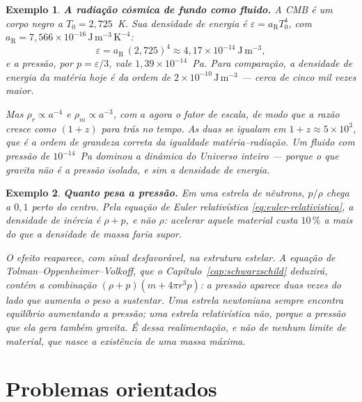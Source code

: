 \documentclass[12pt,a4paper,oneside]{book}
\theoremstyle{rgplain}
\newtheorem{example}{Exemplo}[chapter]
\theoremstyle{rgremark}
\begin{document}
\begin{example}
\textbf{A radiação cósmica de fundo como fluido.} A CMB é um corpo negro a
$T_0=2{,}725$~K. Sua densidade de energia é $\varepsilon=a_{\mathrm{R}}T_0^4$, com
$a_{\mathrm{R}}=7{,}566\times10^{-16}\,\mathrm{J\,m^{-3}\,K^{-4}}$:
\[
  \varepsilon=a_{\mathrm{R}}\,(2{,}725)^4
  \approx4{,}17\times10^{-14}\ \mathrm{J\,m^{-3}} ,
\]
e a pressão, por $p=\varepsilon/3$, vale $1{,}39\times10^{-14}$~Pa. Para
comparação, a densidade de energia da matéria hoje é da ordem de
$2\times10^{-10}\,\mathrm{J\,m^{-3}}$ --- cerca de cinco mil vezes maior.

Mas $\rho_r\propto a^{-4}$ e $\rho_m\propto a^{-3}$, com $a$ agora o fator de escala, de modo que a razão
cresce como $(1+z)$ para trás no tempo. As duas se igualam em
$1+z\approx5\times10^{3}$, que é a ordem de grandeza correta da igualdade
matéria--radiação. Um fluido com pressão de $10^{-14}$~Pa dominou a dinâmica
do Universo inteiro --- porque o que gravita não é a pressão isolada, e sim a
densidade de energia.
\end{example}

\begin{example}
\textbf{Quanto pesa a pressão.} Em uma estrela de nêutrons, $p/\rho$ chega a
$0{,}1$ perto do centro. Pela equação de Euler relativística
\eqref{eq:euler-relativistica}, a densidade de inércia é $\rho+p$, e não
$\rho$: acelerar aquele material custa $10\,\%$ a mais do que a densidade de
massa faria supor.

O efeito reaparece, com sinal desfavorável, na estrutura estelar. A equação
de Tolman--Oppenheimer--Volkoff, que o Capítulo~\ref{cap:schwarzschild}
deduzirá, contém a combinação $(\rho+p)(m+4\pi r^3p)$: a pressão aparece duas
vezes do lado que \emph{aumenta} o peso a sustentar. Uma estrela newtoniana
sempre encontra equilíbrio aumentando a pressão; uma estrela relativística
não, porque a pressão que ela gera também gravita. É dessa realimentação, e
não de nenhum limite de material, que nasce a existência de uma massa máxima.
\end{example}

\section{Problemas orientados}
\end{document}
